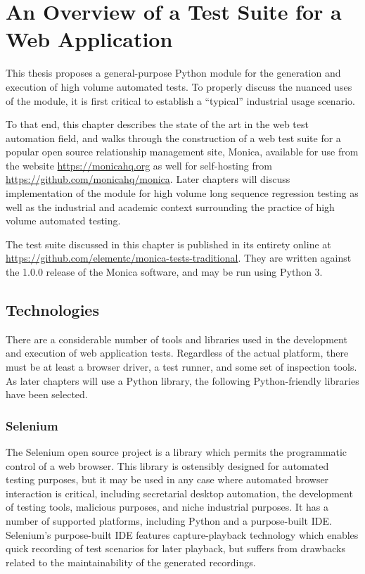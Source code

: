 \chapter{An Overview of a Test Suite for a Web Application}
This thesis proposes a general-purpose Python module for the generation and execution of high volume automated tests. To properly discuss the nuanced uses of the module, it is first critical to establish a ``typical'' industrial usage scenario.

To that end, this chapter describes the state of the art in the web test automation field, and walks through the construction of a web test suite for a popular open source relationship management site, Monica, available for use from the website \url{https://monicahq.org} as well for self-hosting from \url{https://github.com/monicahq/monica}. Later chapters will discuss implementation of the module for high volume long sequence regression testing as well as the industrial and academic context surrounding the practice of high volume automated testing.

The test suite discussed in this chapter is published in its entirety online at \url{https://github.com/elementc/monica-tests-traditional}. They are written against the 1.0.0 release of the Monica software, and may be run using Python 3.

\section{Technologies}
There are a considerable number of tools and libraries used in the development and execution of web application tests.\citep{kaur2013comparative} Regardless of the actual platform, there must be at least a browser driver, a test runner, and some set of inspection tools. As later chapters will use a Python library, the following Python-friendly libraries have been selected.

\subsection{Selenium}
The Selenium open source project is a library which permits the programmatic control of a web browser.\citep{holmes2006automating} This library is ostensibly designed for automated testing purposes\citep{razak2011agile}, but it may be used in any case where automated browser interaction is critical, including secretarial desktop automation, the development of testing tools, malicious purposes, and niche industrial purposes.\citep{kongsli2007security} It has a number of supported platforms, including Python and a purpose-built IDE.\citep{bruns2009web} Selenium's purpose-built IDE features capture-playback technology which enables quick recording of test scenarios for later playback, but suffers from drawbacks related to the maintainability of the generated recordings.\citep{leotta2013capture}

